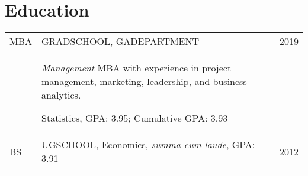 \documentclass[a4paper,10pt]{article}
\begin{document}
\section{Education}
\begin{supertabular}{p{1.5cm}p{13.9cm}>{\raggedleft\arraybackslash}p{1.5cm}}
	\textsc{MBA} & \textsc{GRADSCHOOL}, \small GADEPARTMENT
	& 	\textsc{2019} \\
	& \begin{enumerate*}[label =$\circ$, itemjoin={\newline}]
	\item \footnotesize \emph{Management} MBA with experience in project management, marketing, leadership, and business analytics.
	\item \small Statistics, GPA: 3.95; Cumulative GPA: 3.93
	\end{enumerate*}
	& \\
	\textsc{BS} & \textsc{UGSCHOOL}, \small Economics, \emph{summa cum laude}, GPA: 3.91
	&	\textsc{2012} 	\\
	 \\
\end{supertabular}



\smallskip
\end{document}
